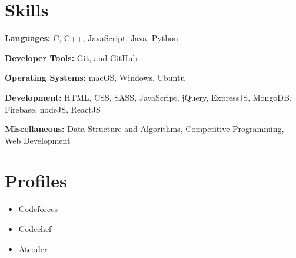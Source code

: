 \documentclass[letterpaper,11pt]{article}
\newcommand{\resumeItem}[1]{
  \item\small{
    {#1 \vspace{-2pt}}
  }
}
\newcommand{\resumeSubHeadingListStart}{\begin{itemize}[leftmargin=0.15in, label={}]}
\newcommand{\resumeSubHeadingListEnd}{\end{itemize}}
\newcommand{\resumeItemListStart}{\begin{itemize}}
\newcommand{\resumeItemListEnd}{\end{itemize}\vspace{-5pt}}
\begin{document}

\section{Skills}
  \vspace{2pt}
  \resumeSubHeadingListStart
    \small{\item{

  
    \textbf{Languages:}{ C, C++, JavaScript, Java, Python} \ \vspace{3pt}

    \textbf{Developer Tools:}{ Git, and GitHub} \ \vspace{3pt}

    \textbf{Operating Systems:}{ macOS, Windows, Ubuntu} \ \vspace{3pt}

    \textbf{Development:}{ HTML, CSS, SASS, JavaScript, jQuery, ExpressJS, MongoDB, Firebase, nodeJS, ReactJS} \ \vspace{3pt}

    \textbf{Miscellaneous:}{ Data Structure and Algorithms, Competitive Programming, Web Development} \ \vspace{3pt}

}}
\resumeSubHeadingListEnd




\section{Profiles}
  \vspace{2pt}
  \resumeItemListStart
  \resumeItem{\underline{\href{https://codeforces.com/profile/govindtomar}{Codeforces}}}\resumeItem{\underline{\href{https://www.codechef.com/users/govindtomar21}{Codechef}}}\resumeItem{\underline{\href{https://atcoder.jp/users/404fixer}{Atcoder}}}
  \resumeItemListEnd

\end{document}
